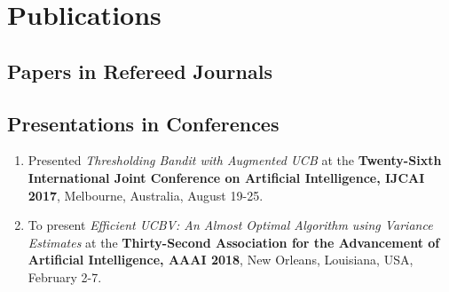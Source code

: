 \documentclass[MS,synopsis]{iitmdiss}
\begin{document}
\section{Publications}
\subsection{Papers in Refereed Journals}


\subsection{Presentations in Conferences}
\begin{enumerate}
\item Presented {\em Thresholding Bandit with Augmented UCB} at the {\bf Twenty-Sixth International Joint Conference on Artificial Intelligence, {IJCAI} 2017}, Melbourne, Australia, August 19-25.
\item To present {\em Efficient UCBV: An Almost Optimal Algorithm using Variance Estimates} at the {\bf Thirty-Second Association for the Advancement of Artificial Intelligence, {AAAI} 2018}, New Orleans, Louisiana, USA, February 2-7.
\end{enumerate} 
\end{document}
